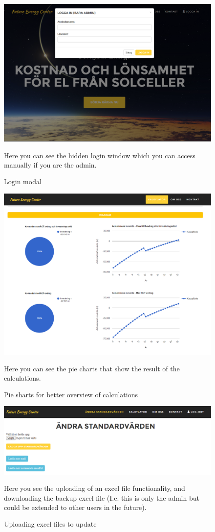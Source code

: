 \documentclass[]{article}
\begin{document}
\begin{figure}[H]
	\includegraphics[width=1.0\linewidth]{pic6}
	\caption{Login modal}
	\medskip
	\small
	Here you can see the hidden login window which you can access manually if you are the admin.
	\label{fig:pic6}
\end{figure}
\begin{figure}[H]
	\includegraphics[width=1.0\linewidth]{pic7}
	\caption{Pie sharts for better overview of calculations}
	\medskip
	\small
	Here you can see the pie charts that show the result of the calculations.
	\label{fig:pic7}
\end{figure}

\begin{figure}[H]
	\includegraphics[width=1.0\linewidth]{pic8}
	\caption{Uploading excel files to update}
	\medskip
	\small
	Here you see the uploading of an excel file functionality, and downloading the backup excel file (I.e. this is only the admin but could be extended to other users in the future).
	\label{fig:pic8}
\end{figure}
\end{document}
